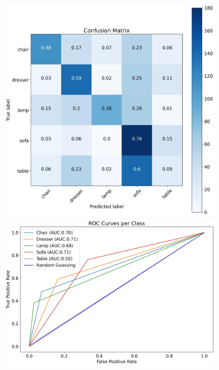 \documentclass[11pt,a4paper]{article}
\begin{document}
\begin{figure}[H]
{{    \includegraphics[scale=0.13]{imgs/experiments/images/6/Experiment-6-TESTING-confusion-matrix.jpg}
    \includegraphics[scale=0.13]{imgs/experiments/images/6/Experiment-6-TESTING-ROC.jpg}
    }}
    \qquad
\end{figure}
\end{document}
